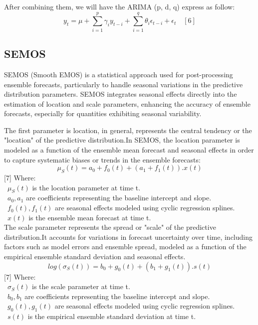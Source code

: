 \documentclass{ieeeojies}
\begin{document}
After combining them, we will have the ARIMA (p, d, q) express as follow:
$$
y_t=\mu+\sum_{i=1}^p \gamma_i y_{t-i}+\sum_{i=1}^q \theta_i \epsilon_{t-i}+\epsilon_t \quad [6]
$$
\subsection{SEMOS}
SEMOS (Smooth EMOS) is a statistical approach used for post-processing ensemble forecasts, particularly to handle seasonal variations in the predictive distribution parameters. SEMOS integrates seasonal effects directly into the estimation of location and scale parameters, enhancing the accuracy of ensemble forecasts, especially for quantities exhibiting seasonal variability.

The first parameter is location, in general, represents the central tendency or the "location" of the predictive distribution.In SEMOS, the location parameter is modeled as a function of the ensemble mean forecast and seasonal effects in order to capture systematic biases or trends in the ensemble forecasts:
\[\mu_S(t) = a_0 + f_0(t) + (a_1 + f_1(t)) . x(t)\] [7]
Where: \\
        \indent\textbullet\ \(\mu_S(t)\) is the location parameter at time t. \\
        \indent\textbullet\ \(a_0, a_1\) are coefficients representing the baseline intercept and slope. \\
        \indent\textbullet\ \(f_0(t), f_1(t)\) are seasonal effects modeled using cyclic regression splines. \\
        \indent\textbullet\ \(x(t)\) is the ensemble mean forecast at time t. \\

The scale parameter represents the spread or "scale" of the predictive distribution.It accounts for variations in forecast uncertainty over time, including factors such as model errors and ensemble spread, modeled as a function of the empirical ensemble standard deviation and seasonal effects.
\[log(\sigma_S(t)) = b_0 + g_0(t) + (b_1 + g_1(t)).s(t)\] [7]
Where: \\
        \indent\textbullet\ \(\sigma_S(t)\) is the scale parameter at time t. \\
        \indent\textbullet\ \(b_0, b_1\) are coefficients representing the baseline intercept and slope. \\
        \indent\textbullet\ \(g_0(t), g_1(t)\) are seasonal effects modeled using cyclic regression splines. \\
        \indent\textbullet\ \(s(t)\) is the empirical ensemble standard deviation at time t.
\end{document}
